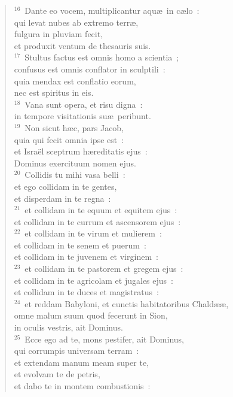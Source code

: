 \begin{flushleft}
\begin{verse}
${}^{16}$~Dante eo vocem, multiplicantur aqu\ae\ in c\ae lo~:\\ qui levat nubes ab extremo terr\ae ,\\ fulgura in pluviam fecit,\\ et produxit ventum de thesauris suis.\\
${}^{17}$~Stultus factus est omnis homo a scientia~;\\ confusus est omnis conflator in sculptili~:\\ quia mendax est conflatio eorum,\\ nec est spiritus in eis.\\
${}^{18}$~Vana sunt opera, et risu digna~:\\ in tempore visitationis su\ae\ peribunt.\\
${}^{19}$~Non sicut h\ae c, pars Jacob,\\ quia qui fecit omnia ipse est~:\\ et Isra\"el sceptrum h\ae reditatis ejus~:\\ Dominus exercituum nomen ejus.\\
${}^{20}$~Collidis tu mihi vasa belli~:\\ et ego collidam in te gentes,\\ et disperdam in te regna~:\\
${}^{21}$~et collidam in te equum et equitem ejus~:\\ et collidam in te currum et ascensorem ejus~:\\
${}^{22}$~et collidam in te virum et mulierem~:\\ et collidam in te senem et puerum~:\\ et collidam in te juvenem et virginem~:\\
${}^{23}$~et collidam in te pastorem et gregem ejus~:\\ et collidam in te agricolam et jugales ejus~:\\ et collidam in te duces et magistratus~:\\
${}^{24}$~et reddam Babyloni, et cunctis habitatoribus Chald\ae \ae ,\\ omne malum suum quod fecerunt in Sion,\\ in oculis vestris, ait Dominus.\\
${}^{25}$~Ecce ego ad te, mons pestifer, ait Dominus,\\ qui corrumpis universam terram~:\\ et extendam manum meam super te,\\ et evolvam te de petris,\\ et dabo te in montem combustionis~:\\

\end{verse}
\end{flushleft}
